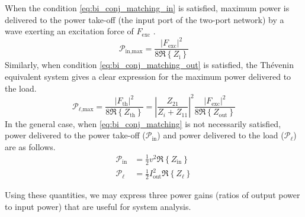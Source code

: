 \documentclass[lettersize,journal]{IEEEtran}
\begin{document}
When the condition \eqref{eq:bi_conj_matching_in} is satisfied, maximum power is delivered to the power take-off (the input port of the two-port network) by a wave exerting an excitation force of $F_{\textrm{exc}}$ \cite{Falnes:2002aa}.
%
\begin{equation}
        \mathcal{P}_{\textrm{in,max}} = \frac{| F_{\textrm{exc}} |^2 }{ 8 \Re \left\{ Z_{\textrm{i}} \right\} }
\end{equation}
%
Similarly, when condition \eqref{eq:bi_conj_matching_out} is satisfied, the Th\'{e}venin equivalent system gives a clear expression for the maximum power delivered to the load.
%
\begin{equation}
        \mathcal{P}_{\ell\textrm{,max}} = \frac{| F_{\textrm{th}} |^2 }{ 8 \Re \left\{ Z_{\textrm{th}} \right\} }
        = \left| \frac{ Z_{21} }{ Z_i + Z_{11} } \right| ^2 \frac{ | F_{\textrm{exc}} |^2 }{ 8 \Re \left\{ Z_{\textrm{out}} \right\} } \label{eq:max_power_delivered_thevenin}
\end{equation}
%
In the general case, when \eqref{eq:bi_conj_matching} is not necessarily satisfied, power delivered to the power take-off ($\mathcal{P}_{\textrm{in}}$) and power delivered to the load ($\mathcal{P}_\ell$) are as follows.
\begin{subequations}
        \begin{align}
                \mathcal{P}_{\textrm{in}} &= \frac{1}{2} v^2 \Re \left\{ Z_{\textrm{in}} \right\}\\
                \mathcal{P}_\ell &= \frac{1}{2} I_{\textrm{out}}^2 \Re \left\{ Z_{\ell} \right\}
        \end{align}
\end{subequations}

Using these quantities, we may express three power gains (ratios of output power to input power) that are useful for system analysis. 
\end{document}

